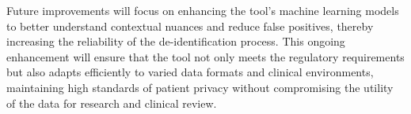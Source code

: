 Future improvements will focus on enhancing the tool's machine
learning models to better understand contextual nuances and reduce
false positives, thereby increasing the reliability of the
de-identification process. This ongoing enhancement will ensure that
the tool not only meets the regulatory requirements but also adapts
efficiently to varied data formats and clinical environments,
maintaining high standards of patient privacy without compromising the
utility of the data for research and clinical review.

